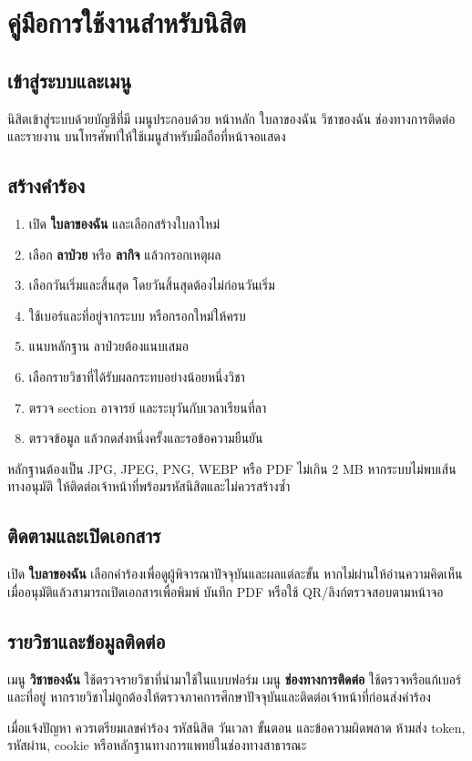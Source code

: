 \section{คู่มือการใช้งานสำหรับนิสิต}
\subsection{เข้าสู่ระบบและเมนู}
นิสิตเข้าสู่ระบบด้วยบัญชีที่มี  เมนูประกอบด้วย หน้าหลัก ใบลาของฉัน วิชาของฉัน ช่องทางการติดต่อ และรายงาน บนโทรศัพท์ให้ใช้เมนูสำหรับมือถือที่หน้าจอแสดง

\subsection{สร้างคำร้อง}
\begin{enumerate}
  \item เปิด \textbf{ใบลาของฉัน} และเลือกสร้างใบลาใหม่
  \item เลือก \textbf{ลาป่วย} หรือ \textbf{ลากิจ} แล้วกรอกเหตุผล
  \item เลือกวันเริ่มและสิ้นสุด โดยวันสิ้นสุดต้องไม่ก่อนวันเริ่ม
  \item ใช้เบอร์และที่อยู่จากระบบ หรือกรอกใหม่ให้ครบ
  \item แนบหลักฐาน ลาป่วยต้องแนบเสมอ
  \item เลือกรายวิชาที่ได้รับผลกระทบอย่างน้อยหนึ่งวิชา
  \item ตรวจ section อาจารย์ และระบุวันกับเวลาเรียนที่ลา
  \item ตรวจข้อมูล แล้วกดส่งหนึ่งครั้งและรอข้อความยืนยัน
\end{enumerate}
หลักฐานต้องเป็น JPG, JPEG, PNG, WEBP หรือ PDF ไม่เกิน 2 MB หากระบบไม่พบเส้นทางอนุมัติ ให้ติดต่อเจ้าหน้าที่พร้อมรหัสนิสิตและไม่ควรสร้างซ้ำ

\subsection{ติดตามและเปิดเอกสาร}
เปิด \textbf{ใบลาของฉัน} เลือกคำร้องเพื่อดูผู้พิจารณาปัจจุบันและผลแต่ละขั้น หากไม่ผ่านให้อ่านความคิดเห็น เมื่ออนุมัติแล้วสามารถเปิดเอกสารเพื่อพิมพ์ บันทึก PDF หรือใช้ QR/ลิงก์ตรวจสอบตามหน้าจอ

\subsection{รายวิชาและข้อมูลติดต่อ}
เมนู \textbf{วิชาของฉัน} ใช้ตรวจรายวิชาที่นำมาใช้ในแบบฟอร์ม เมนู \textbf{ช่องทางการติดต่อ} ใช้ตรวจหรือแก้เบอร์และที่อยู่ หากรายวิชาไม่ถูกต้องให้ตรวจภาคการศึกษาปัจจุบันและติดต่อเจ้าหน้าที่ก่อนส่งคำร้อง

เมื่อแจ้งปัญหา ควรเตรียมเลขคำร้อง รหัสนิสิต วันเวลา ขั้นตอน และข้อความผิดพลาด ห้ามส่ง token, รหัสผ่าน, cookie หรือหลักฐานทางการแพทย์ในช่องทางสาธารณะ
